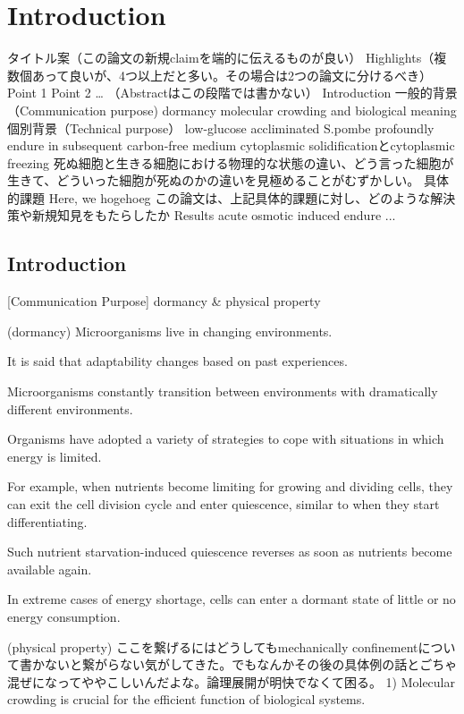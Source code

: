 \chapter{Introduction}
タイトル案（この論文の新規claimを端的に伝えるものが良い）
Highlights（複数個あって良いが、4つ以上だと多い。その場合は2つの論文に分けるべき）
Point 1
Point 2
…
（Abstractはこの段階では書かない）
Introduction
一般的背景（Communication purpose)
dormancy
molecular crowding and biological meaning
個別背景（Technical purpose）
low-glucose accliminated S.pombe profoundly endure in subsequent carbon-free medium
cytoplasmic solidificationとcytoplasmic freezing
死ぬ細胞と生きる細胞における物理的な状態の違い、どう言った細胞が生きて、どういった細胞が死ぬのかの違いを見極めることがむずかしい。
具体的課題
Here, we hogehoeg
この論文は、上記具体的課題に対し、どのような解決策や新規知見をもたらしたか
Results
acute
osmotic induced endure
... 

\section{Introduction}
[Communication Purpose] 
dormancy \& physical property

(dormancy)
Microorganisms live in changing environments. 

It is said that adaptability changes based on past experiences. 

Microorganisms constantly transition between environments with dramatically different environments. 

Organisms have adopted a variety of strategies to cope with situations in which energy is limited. 

For example, when nutrients become limiting for growing and dividing cells, they can exit the cell division cycle and enter quiescence, similar to when they start differentiating. 

Such nutrient starvation-induced quiescence reverses as soon as nutrients become available again.

In extreme cases of energy shortage, cells can enter a dormant state of little or no energy consumption.

(physical property)
ここを繋げるにはどうしてもmechanically confinementについて書かないと繋がらない気がしてきた。でもなんかその後の具体例の話とごちゃ混ぜになってややこしいんだよな。論理展開が明快でなくて困る。
1) Molecular crowding is crucial for the efficient function of biological systems. \cite{lohka1985induction}\cite{zhou2008macromolecular}\cite{miermont2013severe}\cite{chen2024viscosity}\cite{neurohr2020relevance}

